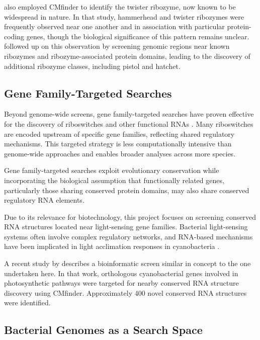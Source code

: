 \documentclass{article}
\begin{document}
\textcite{Roth2014} also employed CMfinder to identify the twister ribozyme, now known to be widespread in nature.
In that study, hammerhead and twister ribozymes were frequently observed near one another and in association with particular protein-coding genes, though the biological significance of this pattern remains unclear.
\textcite{Weinberg2015} followed up on this observation by screening genomic regions near known ribozymes and ribozyme-associated protein domains, leading to the discovery of additional ribozyme classes, including pistol and hatchet.

\subsection{Gene Family-Targeted Searches}

Beyond genome-wide screens, gene family-targeted searches have proven effective for the discovery of riboswitches and other functional RNAs \parencite{Micura2020, Kavita2023}.
Many riboswitches are encoded upstream of specific gene families, reflecting shared regulatory mechanisms.
This targeted strategy is less computationally intensive than genome-wide approaches and enables broader analyses across more species.

Gene family-targeted searches exploit evolutionary conservation while incorporating the biological assumption that functionally related genes, particularly those sharing conserved protein domains, may also share conserved regulatory RNA elements.

Due to its relevance for biotechnology, this project focuses on screening conserved RNA structures located near light-sensing gene families.
Bacterial light-sensing systems often involve complex regulatory networks, and RNA-based mechanisms have been implicated in light acclimation responses in cyanobacteria \parencite{Hihara2015}.

A recent study by \textcite{Geissler2026} describes a bioinformatic screen similar in concept to the one undertaken here.
In that work, orthologous cyanobacterial genes involved in photosynthetic pathways were targeted for nearby conserved RNA structure discovery using CMfinder.
Approximately 400 novel conserved RNA structures were identified.

\subsection{Bacterial Genomes as a Search Space}
\end{document}

